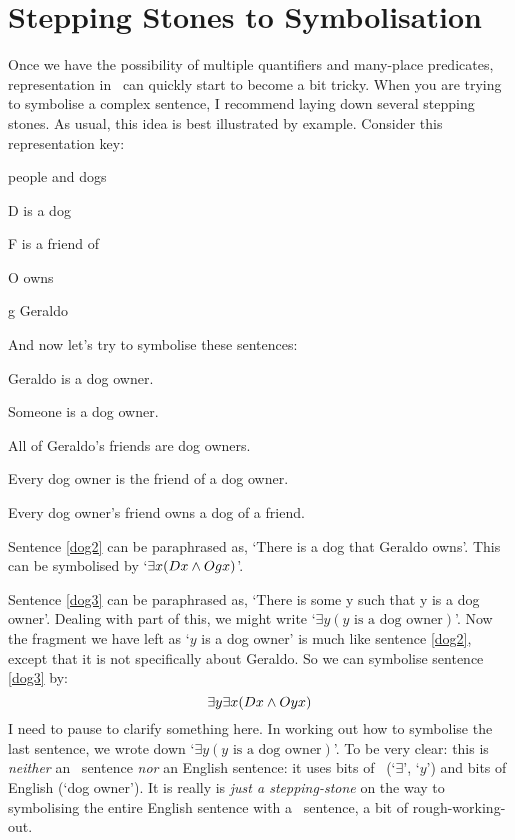\section{Stepping Stones to Symbolisation}
Once we have the possibility of multiple quantifiers and many-place predicates, representation in \FOL\ can quickly start to become a bit tricky. When you are trying to symbolise a complex sentence, I recommend laying down several stepping stones. As usual, this idea is best illustrated by example. Consider this representation key:
\begin{ekey}
\item[\text{domain}] people and dogs
\item[D]  is a dog
\item[F]  is a friend of 
\item[O]  owns 
\item[g] Geraldo
\end{ekey}
And now let's try to symbolise these sentences:
\begin{earg}
\item[\ex{dog2}] Geraldo is a dog owner.
\item[\ex{dog3}] Someone is a dog owner.
\item[\ex{dog4}] All of Geraldo's friends are dog owners.
\item[\ex{dog5}] Every dog owner is the friend of a dog owner.
\item[\ex{dog6}] Every dog owner's friend owns a dog of a friend.
\end{earg}
Sentence \ref{dog2} can be paraphrased as, `There is a dog that Geraldo owns'. This can be symbolised by `$\exists x(Dx \wedge Ogx)$'.

Sentence \ref{dog3} can be paraphrased as, `There is some y such that y is a dog owner'. Dealing with part of this, we might write `$\exists y(y\text{ is a dog owner})$'. Now the fragment we have left as `$y$ is a dog owner' is much like sentence \ref{dog2}, except that it is not specifically about Geraldo. So we can symbolise sentence \ref{dog3} by:
$$\exists y \exists x(Dx \wedge Oyx)$$
I need to pause to clarify something here. In working out how to symbolise the last sentence, we wrote down `$\exists y(y\text{ is a dog owner})$'. To be very clear: this is \emph{neither} an \FOL\ sentence \emph{nor} an English sentence: it uses bits of \FOL\ (`$\exists$', `$y$') and bits of English (`dog owner'). It is really is \emph{just a stepping-stone} on the way to symbolising the entire English sentence with a \FOL\ sentence, a bit of rough-working-out.

